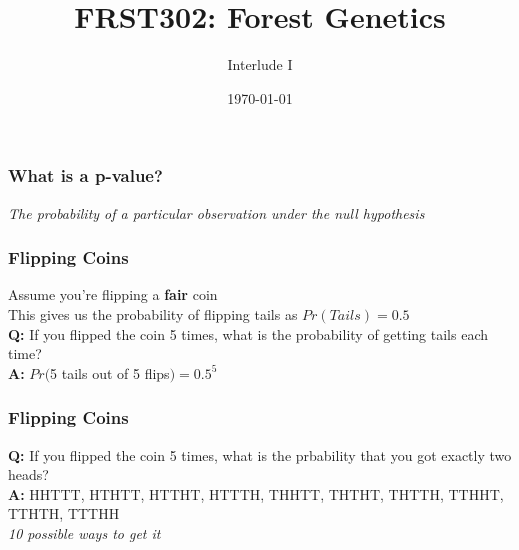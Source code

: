 \documentclass[xcolor=dvipsnames]{beamer}
\title{\Huge FRST302: Forest Genetics}
\author{\Large Interlude I}
\date{\today}
\begin{document}
	\maketitle

\begin{frame}
\frametitle{What is a p-value?}
\pause
\Large \textit{The probability of a particular observation under the null hypothesis}

\end{frame}


\begin{frame}
	\frametitle{Flipping Coins}
	Assume you're flipping a \textbf{fair} coin\\ \pause
	\vspace{10pt}
	This gives us the probability of flipping tails as $Pr(Tails)=0.5$\\ \pause
	\vspace{10pt}
	\textbf{Q:} If you flipped the coin 5 times, what is the probability of getting tails each time? \\ \pause
	\vspace{10pt}
	\textbf{A:} $Pr($5 tails out of 5 flips$) = 0.5^5$	
	


	

\end{frame}



\begin{frame}
	\frametitle{Flipping Coins}

	\textbf{Q:} If you flipped the coin 5 times, what is the prbability that you got exactly two heads? \\ \pause
	\vspace{10pt}
	\textbf{A:} HHTTT, HTHTT, HTTHT, HTTTH, THHTT, THTHT, THTTH, TTHHT, TTHTH, TTTHH\\
	\textit{10 possible ways to get it } 
		
		

\end{frame}
\end{document}
